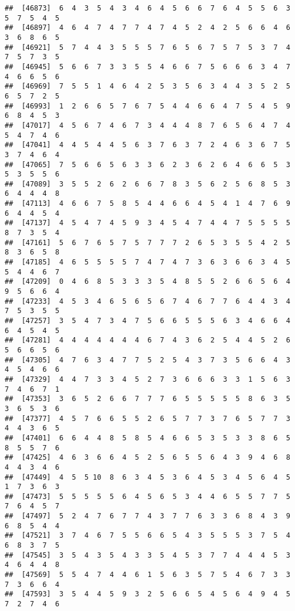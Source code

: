 \documentclass[
]{book}
\begin{document}
\begin{verbatim}
##  [46873]  6  4  3  5  4  3  4  6  4  5  6  6  7  6  4  5  5  6  3  5  7  5  4  5
##  [46897]  4  6  4  7  4  7  7  4  7  4  5  2  4  2  5  6  6  4  6  3  6  8  6  5
##  [46921]  5  7  4  4  3  5  5  5  7  6  5  6  7  5  7  5  3  7  4  7  5  7  3  5
##  [46945]  5  6  6  7  3  3  5  5  4  6  6  7  5  6  6  6  3  4  7  4  6  6  5  6
##  [46969]  7  5  5  1  4  6  4  2  5  3  5  6  3  4  4  3  5  2  5  6  5  7  2  5
##  [46993]  1  2  6  6  5  7  6  7  5  4  4  6  6  4  7  5  4  5  9  6  8  4  5  3
##  [47017]  4  5  6  7  4  6  7  3  4  4  4  8  7  6  5  6  4  7  4  5  4  7  4  6
##  [47041]  4  4  5  4  4  5  6  3  7  6  3  7  2  4  6  3  6  7  5  3  7  4  6  4
##  [47065]  7  5  6  6  5  6  3  3  6  2  3  6  2  6  4  6  6  5  3  5  3  5  5  6
##  [47089]  3  5  5  2  6  2  6  6  7  8  3  5  6  2  5  6  8  5  3  6  4  4  4  8
##  [47113]  4  6  6  7  5  8  5  4  4  6  6  4  5  4  1  4  7  6  9  6  4  4  5  4
##  [47137]  4  5  4  7  4  5  9  3  4  5  4  7  4  4  7  5  5  5  5  8  7  3  5  4
##  [47161]  5  6  7  6  5  7  5  7  7  7  2  6  5  3  5  5  4  2  5  8  3  6  5  8
##  [47185]  4  6  5  5  5  5  7  4  7  4  7  3  6  3  6  6  3  4  5  5  4  4  6  7
##  [47209]  0  4  6  8  5  3  3  3  5  4  8  5  5  2  6  6  5  6  4  9  5  6  6  4
##  [47233]  4  5  3  4  6  5  6  5  6  7  4  6  7  7  6  4  4  3  4  7  5  3  5  5
##  [47257]  3  5  4  7  3  4  7  5  6  6  5  5  5  6  3  4  6  6  4  6  4  5  4  5
##  [47281]  4  4  4  4  4  4  4  6  7  4  3  6  2  5  4  4  5  2  6  5  6  6  5  6
##  [47305]  4  7  6  3  4  7  7  5  2  5  4  3  7  3  5  6  6  4  3  4  5  4  6  6
##  [47329]  4  4  7  3  3  4  5  2  7  3  6  6  6  3  3  1  5  6  3  7  4  6  7  1
##  [47353]  3  6  5  2  6  6  7  7  7  6  5  5  5  5  5  8  6  3  5  3  6  5  3  6
##  [47377]  4  5  7  6  6  5  5  2  6  5  7  7  3  7  6  5  7  7  3  4  4  3  6  5
##  [47401]  6  6  4  4  8  5  8  5  4  6  6  5  3  5  3  3  8  6  5  8  5  5  7  6
##  [47425]  4  6  3  6  6  4  5  2  5  6  5  5  6  4  3  9  4  6  8  4  4  3  4  6
##  [47449]  4  5  5 10  8  6  3  4  5  3  6  4  5  3  4  5  6  4  5  1  7  3  6  3
##  [47473]  5  5  5  5  5  6  4  5  6  5  3  4  4  6  5  5  7  7  5  7  6  4  5  7
##  [47497]  5  2  4  7  6  7  7  4  3  7  7  6  3  3  6  8  4  3  9  6  8  5  4  4
##  [47521]  3  7  4  6  7  5  5  6  6  5  4  3  5  5  5  3  7  5  4  6  8  3  7  5
##  [47545]  3  5  4  3  5  4  3  3  5  4  5  3  7  7  4  4  4  5  3  4  6  4  4  8
##  [47569]  5  5  4  7  4  4  6  1  5  6  3  5  7  5  4  6  7  3  3  7  3  6  6  4
##  [47593]  3  5  4  4  5  9  3  2  5  6  6  5  4  5  6  4  9  4  5  7  2  7  4  6

\end{verbatim}
\end{document}
